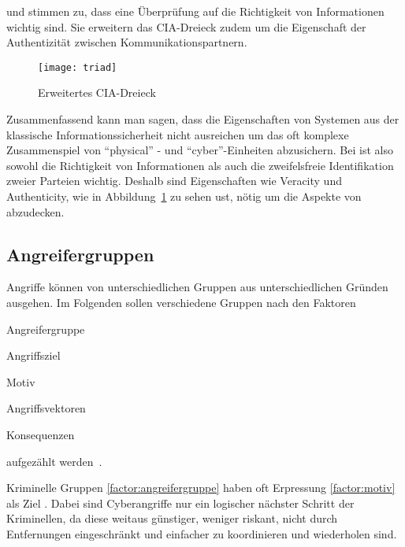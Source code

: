 \citeauthor{WYX+10} und \citeauthor{SFJ2017} stimmen zu, dass eine Überprüfung auf die Richtigkeit von Informationen wichtig sind.
Sie erweitern das CIA-Dreieck zudem um die Eigenschaft der Authentizität zwischen Kommunikationspartnern.

\begin{figure}
    \centering
    \texttt{[image: triad]}
    \caption{Erweitertes CIA-Dreieck}
    \label{fig:triad}
\end{figure}

Zusammenfassend kann man sagen, dass die Eigenschaften von Systemen aus der klassische Informationssicherheit nicht ausreichen um das oft komplexe Zusammenspiel von \enquote{physical} - und \enquote{cyber}-Einheiten abzusichern.
Bei \cps ist also sowohl die Richtigkeit von Informationen als auch die zweifelsfreie Identifikation zweier Parteien wichtig.
Deshalb sind Eigenschaften wie Veracity und Authenticity, wie in Abbildung~\ref{fig:triad} zu sehen ust, nötig um die Aspekte von \cps abzudecken.


\subsection{Angreifergruppen}\label{subsec:angreifergruppen}

Angriffe können von unterschiedlichen Gruppen aus unterschiedlichen Gründen ausgehen.
Im Folgenden sollen verschiedene Gruppen nach den Faktoren
\begin{enumerate*}[label=(\alph*),before=\unskip{: }, itemjoin={{; }}, itemjoin*={{, und }}]
    \item Angreifergruppe\label{factor:angreifergruppe}
    \item Angriffsziel\label{factor:target}
    \item Motiv\label{factor:motiv}
    \item Angriffsvektoren\label{factor:methode}
    \item Konsequenzen\label{factor:konsequenz}
\end{enumerate*} aufgezählt werden~\cite{HLL+17}.

Kriminelle Gruppen \ref{factor:angreifergruppe} haben oft Erpressung \ref{factor:motiv} als Ziel \cite{WYX+10}.
Dabei sind Cyberangriffe nur ein logischer nächster Schritt der Kriminellen, da diese weitaus günstiger, weniger riskant, nicht durch Entfernungen eingeschränkt und einfacher zu koordinieren und wiederholen sind. \cite{CAS+09}

